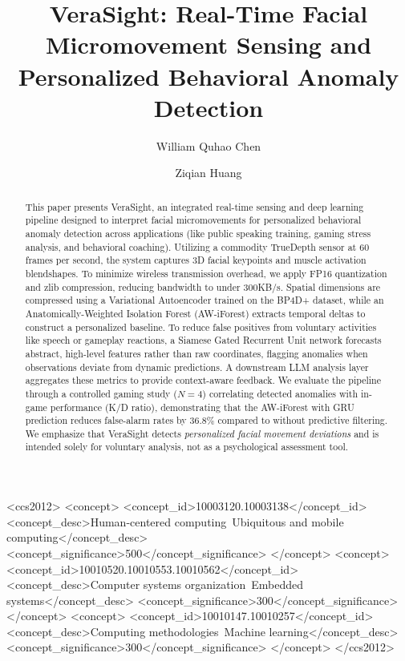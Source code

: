 \documentclass[sigconf]{acmart}
\begin{document}
\title[VeraSight: Real-Time Facial Micromovement Sensing]{VeraSight: Real-Time Facial Micromovement Sensing and Personalized Behavioral Anomaly Detection}

\author{William Quhao Chen}

\author{Ziqian Huang}

\renewcommand{\shortauthors}{Chen and Huang}

\begin{abstract}
This paper presents VeraSight, an integrated real-time sensing and deep learning pipeline designed to interpret facial micromovements for personalized behavioral anomaly detection across applications (like public speaking training, gaming stress analysis, and behavioral coaching). Utilizing a commodity TrueDepth sensor at 60 frames per second, the system captures 3D facial keypoints and muscle activation blendshapes. To minimize wireless transmission overhead, we apply FP16 quantization and zlib compression, reducing bandwidth to under 300KB/s. Spatial dimensions are compressed using a Variational Autoencoder trained on the BP4D+ dataset, while an Anatomically-Weighted Isolation Forest (AW-iForest) extracts temporal deltas to construct a personalized baseline. To reduce false positives from voluntary activities like speech or gameplay reactions, a Siamese Gated Recurrent Unit network forecasts abstract, high-level features rather than raw coordinates, flagging anomalies when observations deviate from dynamic predictions. A downstream LLM analysis layer aggregates these metrics to provide context-aware feedback. We evaluate the pipeline through a controlled gaming study ($N=4$) correlating detected anomalies with in-game performance (K/D ratio), demonstrating that the AW-iForest with GRU prediction reduces false-alarm rates by 36.8\% compared to without predictive filtering. We emphasize that VeraSight detects \emph{personalized facial movement deviations} and is intended solely for voluntary analysis, not as a psychological assessment tool.
\end{abstract}

\begin{CCSXML}
<ccs2012>
  <concept>
    <concept_id>10003120.10003138</concept_id>
    <concept_desc>Human-centered computing~Ubiquitous and mobile computing</concept_desc>
    <concept_significance>500</concept_significance>
  </concept>
  <concept>
    <concept_id>10010520.10010553.10010562</concept_id>
    <concept_desc>Computer systems organization~Embedded systems</concept_desc>
    <concept_significance>300</concept_significance>
  </concept>
  <concept>
    <concept_id>10010147.10010257</concept_id>
    <concept_desc>Computing methodologies~Machine learning</concept_desc>
    <concept_significance>300</concept_significance>
  </concept>
</ccs2012>
\end{CCSXML}
\end{document}
